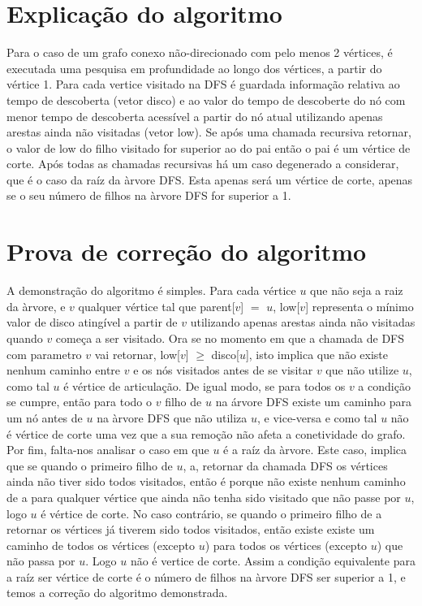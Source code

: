 \documentclass{scrartcl}
\begin{document}
\section*{Explicação do algoritmo}
 Para o caso de um grafo conexo não-direcionado com pelo menos 2 vértices, é executada uma pesquisa em profundidade ao longo dos vértices, a partir do vértice 1. Para cada vertice visitado na DFS é guardada informação relativa ao tempo de descoberta (vetor disco) e ao valor do tempo de descoberte do nó com menor tempo de descoberta acessível a partir do nó atual utilizando apenas arestas ainda não visitadas (vetor low). Se após uma chamada recursiva retornar, o valor de low do filho visitado for superior ao do pai então o pai é um vértice de corte.
Após todas as chamadas recursivas há um caso degenerado a considerar, que é o caso da raíz da àrvore DFS. Esta apenas será um vértice de corte, apenas se o seu número de filhos na àrvore DFS for superior a 1.

\section*{Prova de correção do algoritmo}
A demonstração do algoritmo é simples. Para cada vértice $u$ que não seja a raiz da àrvore, e $v$ qualquer vértice tal que parent[$v$] $=$ $u$, low[$v$] representa o mínimo valor de disco atingível a partir de $v$ utilizando apenas arestas ainda não visitadas quando $v$ começa a ser visitado. Ora se no momento em que a chamada de DFS com parametro $v$ vai retornar, low[$v$] $\ge$ disco[$u$], isto implica que não existe nenhum caminho entre $v$ e os nós visitados antes de se visitar $v$ que não utilize $u$, como tal $u$ é vértice de articulação. De igual modo, se para todos os $v$ a condição se cumpre, então para todo o $v$ filho de $u$ na árvore DFS existe um caminho para um nó antes de $u$ na àrvore DFS que não utiliza $u$, e vice-versa e como tal $u$ não é vértice de corte uma vez que a sua remoção não afeta a conetividade do grafo. Por fim, falta-nos analisar o caso em que $u$ é a raíz da àrvore. Este caso, implica que se quando o primeiro filho de $u$, a, retornar da chamada DFS os vértices ainda não tiver sido todos visitados, então é porque não existe nenhum caminho de a para qualquer vértice que ainda não tenha sido visitado que não passe por $u$, logo $u$ é vértice de corte. No caso contrário, se quando o primeiro filho de a retornar os vértices já tiverem sido todos visitados, então existe existe um caminho de todos os vértices (excepto $u$) para todos os vértices (excepto $u$) que não passa por $u$. Logo $u$ não é vertice de corte. Assim a condição equivalente para a raíz ser vértice de corte é o número de filhos na àrvore DFS ser superior a 1, e temos a correção do algoritmo demonstrada.
\end{document}
